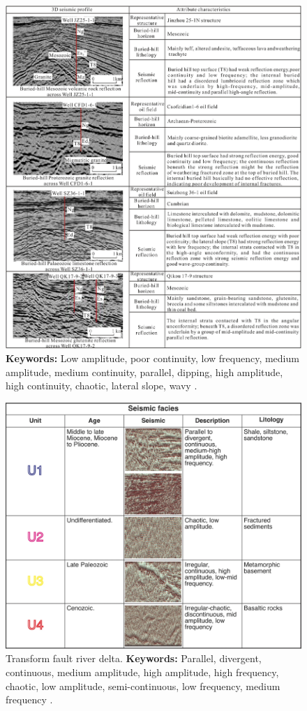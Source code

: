 \begin{figure}[h!]
    \centering
    \includegraphics[width=0.9\linewidth]{Figures/0.3Seismic/Deng2017_buriedhill.png}
    \caption[Buried hill]{\textbf{Keywords: } Low amplitude, poor continuity, low frequency, medium amplitude, medium continuity, parallel, dipping, high amplitude, high continuity, chaotic, lateral slope, wavy \citep{Deng2017}.}
    \label{fig:Deng2017-1}
\end{figure}
\clearpage

\begin{figure}[h!]
    \centering
    \includegraphics[width=0.9\linewidth]{Figures/0.3Seismic/Escobar2024_delta.png}
    \caption[Transform fault river delta.]{Transform fault river delta. \textbf{Keywords:} Parallel, divergent, continuous, medium amplitude, high amplitude, high frequency, chaotic, low amplitude, semi-continuous, low frequency, medium frequency \citep{Escobar2024}.}
    \label{fig:Escobar2024-1}
\end{figure}

